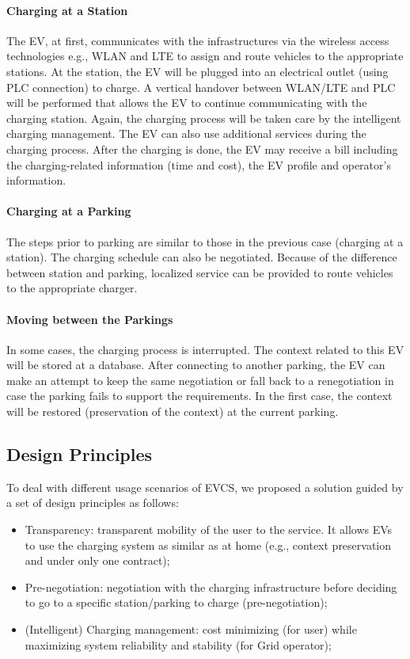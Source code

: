 \paragraph{Charging at a Station} The EV, at first, communicates with the infrastructures via the wireless access technologies e.g., WLAN and LTE to assign and route vehicles to the appropriate stations. At the station, the EV will be plugged into an electrical outlet (using PLC connection) to charge. A vertical handover between WLAN/LTE and PLC will be performed that allows the EV to continue communicating with the charging station. Again, the charging process will be taken care by the intelligent charging management. The EV can also use additional services during the charging process. After the charging is done, the EV may receive a bill including the charging-related information (time and cost), the EV profile and operator's information.  
\paragraph{Charging at a Parking} The steps prior to parking are similar to those in the previous case (charging at a station). The charging schedule can also be negotiated. Because of the difference between station and parking, localized service can be provided to route vehicles to the appropriate charger. 
\paragraph{Moving between the Parkings}
In some cases, the charging process is interrupted. The context related to this EV will be stored at a database. After connecting to another parking, the EV can make an attempt to keep the same negotiation or fall back to a renegotiation in case the parking fails to support the requirements. In the first case, the context will be restored (preservation of the context) at the current parking.
\subsection{Design Principles}
To deal with different usage scenarios of EVCS, we proposed a solution guided by a set of design
principles as follows:
\begin{itemize}
\itemsep 0.07em
\item Transparency: transparent mobility of the user to the service. It allows EVs to use the charging system as similar as at home (e.g., context preservation and under only one contract);
\item Pre-negotiation: negotiation with the charging infrastructure before deciding to go to a specific station/parking to charge (pre-negotiation);
\item (Intelligent) Charging management: cost minimizing (for user) while maximizing system reliability and stability (for Grid operator);
\end{itemize}


